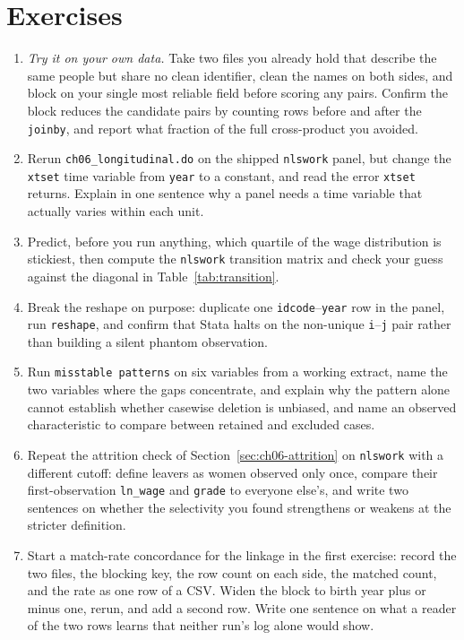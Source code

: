 \section*{Exercises}
\begin{enumerate}
\item \emph{Try it on your own data.} Take two files you already hold that describe the same people but share no clean identifier, clean the names on both sides, and block on your single most reliable field before scoring any pairs. Confirm the block reduces the candidate pairs by counting rows before and after the \texttt{joinby}, and report what fraction of the full cross-product you avoided.
\item Rerun \texttt{ch06\_longitudinal.do} on the shipped \texttt{nlswork} panel, but change the \texttt{xtset} time variable from \texttt{year} to a constant, and read the error \texttt{xtset} returns. Explain in one sentence why a panel needs a time variable that actually varies within each unit.
\item Predict, before you run anything, which quartile of the wage distribution is stickiest, then compute the \texttt{nlswork} transition matrix and check your guess against the diagonal in Table~\ref{tab:transition}.
\item Break the reshape on purpose: duplicate one \texttt{idcode}--\texttt{year} row in the panel, run \texttt{reshape}, and confirm that Stata halts on the non-unique \texttt{i}--\texttt{j} pair rather than building a silent phantom observation.
\item Run \texttt{misstable patterns} on six variables from a working extract, name the two variables where the gaps concentrate, and explain why the pattern alone cannot establish whether casewise deletion is unbiased, and name an observed characteristic to compare between retained and excluded cases.
\item Repeat the attrition check of Section~\ref{sec:ch06-attrition} on \texttt{nlswork} with a different cutoff: define leavers as women observed only once, compare their first-observation \texttt{ln\_wage} and \texttt{grade} to everyone else's, and write two sentences on whether the selectivity you found strengthens or weakens at the stricter definition.
\item Start a match-rate concordance for the linkage in the first exercise: record the two files, the blocking key, the row count on each side, the matched count, and the rate as one row of a CSV. Widen the block to birth year plus or minus one, rerun, and add a second row. Write one sentence on what a reader of the two rows learns that neither run's log alone would show.
\end{enumerate}
